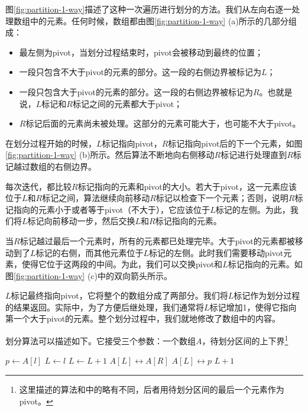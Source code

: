 \documentclass[UTF8]{article}
\begin{document}
图\ref{fig:partition-1-way}描述了这种一次遍历进行划分的方法。我们从左向右逐一处理数组中的元素。任何时候，数组都由图\ref{fig:partition-1-way} (a)所示的几部分组成：

\begin{itemize}
\item 最左侧为pivot，当划分过程结束时，pivot会被移动到最终的位置；
\item 一段只包含不大于pivot的元素的部分。这一段的右侧边界被标记为$L$；
\item 一段只包含大于pivot的元素的部分。这一段的右侧边界被标记为$R$。也就是说，$L$标记和$R$标记之间的元素都大于pivot；
\item $R$标记后面的元素尚未被处理。这部分的元素可能大于，也可能不大于pivot。
\end{itemize}

在划分过程开始的时候，$L$标记指向pivot，$R$标记指向pivot后的下一个元素，如图\ref{fig:partition-1-way} (b)所示。然后算法不断地向右侧移动$R$标记进行处理直到$R$标记越过数组的右侧边界。

每次迭代，都比较$R$标记指向的元素和pivot的大小。若大于pivot，这一元素应该位于$L$和$R$标记之间，算法继续向前移动$R$标记以检查下一个元素；否则，说明$R$标记指向的元素小于或者等于pivot（不大于），它应该位于$L$标记的左侧。为此，我们将$L$标记向前移动一步，然后交换$L$和$R$标记指向的元素。

当$R$标记越过最后一个元素时，所有的元素都已处理完毕。大于pivot的元素都被移动到了$L$标记的右侧，而其他元素位于$L$标记的左侧。此时我们需要移动pivot元素，使得它位于这两段的中间。为此，我们可以交换pivot和$L$标记指向的元素。如图\ref{fig:partition-1-way} (c)中的双向箭头所示。

$L$标记最终指向pivot，它将整个的数组分成了两部分。我们将$L$标记作为划分过程的结果返回。实际中，为了方便后继处理，我们通常将$L$标记增加1，使得它指向第一个大于pivot的元素。整个划分过程中，我们就地修改了数组中的内容。

划分算法可以描述如下。它接受三个参数：一个数组$A$，待划分区间的上下界\footnote{这里描述的算法和\cite{CLRS}中的略有不同，后者用待划分区间的最后一个元素作为pivot。}

\begin{algorithmic}[1]
  \State $p \gets A[l]$  
  \State $L \gets l$ 
   
     
      \State $L \gets L + 1$
      \State {} $A[L] \leftrightarrow A[R]$
    \EndIf
  \EndFor
  \State {} $A[L] \leftrightarrow p$
  \State \Return $L + 1$ 
\EndFunction
\end{algorithmic}
\end{document}
